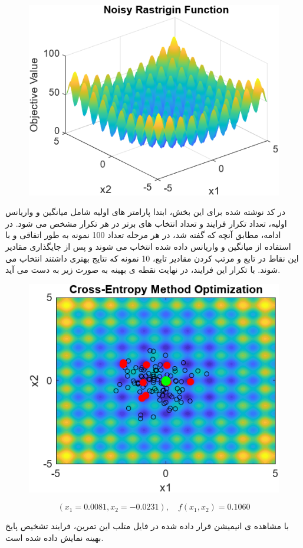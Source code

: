 \begin{figure}[H]
	\centering
	\includegraphics[width=1\linewidth]{../img/Rastrigin}
	\caption{}
	\label{fig:rastrigin}
\end{figure}

در کد نوشته شده برای این بخش، ابتدا پارامتر های اولیه شامل میانگین و واریانس اولیه، تعداد تکرار فرایند و تعداد انتخاب های برتر در هر تکرار مشخص می شود.
در ادامه، مطابق آنچه که گفته شد، در هر مرحله تعداد 100 نمونه به طور اتفاقی و با استفاده از میانگین و واریانس داده شده انتخاب می شوند و پس از جایگذاری مقادیر این نقاط در تابع و مرتب کردن مقادیر تابع، 10 نمونه که نتایج بهتری داشتند انتخاب می شوند. 
با تکرار این فرایند، در نهایت نقطه ی بهینه به صورت زیر به دست می آید.


\begin{figure}[H]
	\centering
	\includegraphics[width=1\linewidth]{../img/Q5}
	\caption{}
	\label{fig:q5}
\end{figure}
 
 \[
 (x_1 = 0.0081, x_2 = -0.0231) , \quad f(x_1, x_2) = 0.1060
 \]
 
 با مشاهده ی انیمیشن قرار داده شده در فایل متلب این تمرین، فرایند تشخیص پایخ بهینه نمایش داده شده است.
 
 
 
 
 